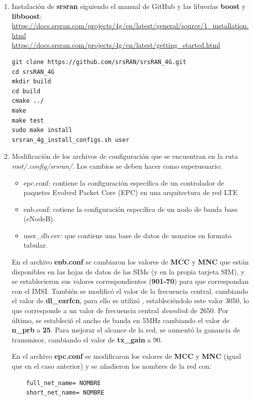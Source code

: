 \begin{enumerate}
\item Instalación de \textbf{srsran} siguiendo el manual de GitHub y las librerías \textbf{boost} y \textbf{libboost}:\\
\url{https://docs.srsran.com/projects/4g/en/latest/general/source/1_installation.html}\\
\url{https://docs.srsran.com/projects/4g/en/latest/getting_started.html}

\begin{lstlisting}
git clone https://github.com/srsRAN/srsRAN_4G.git
cd srsRAN_4G
mkdir build
cd build
cmake ../
make
make test
sudo make install
srsran_4g_install_configs.sh user
\end{lstlisting}

\item Modificación de los archivos de configuración que se encuentran en la ruta \textit{root/.config/srsran/}. Los cambios se deben hacer como superusuario:
\begin{itemize}
	\item epc.conf: contiene la configuración específica de un controlador de paquetes Evolved Packet Core (EPC) en una arquitectura de red LTE 
	\item enb.conf: cotiene la configuración específica de un nodo de banda base (eNodeB).
	\item user_db.csv: que contiene una base de datos de usuarios en formato tabular.
\end{itemize}

En el archivo \textbf{enb.conf} se cambiaron los valores de \textbf{MCC} y \textbf{MNC} que están disponibles en las hojas de datos de las SIMs (y en la propia tarjeta SIM), y se establecieron sus valores correspondientes (\textbf{901-70}) para que correspondan con el IMSI. También se modificó el valor de la frecuencia central. cambiando el valor de \textbf{dl_earfcn}, para ello se utilizó \cite{earn}, estableciéndolo este valor 3050, lo que corresponde a un valor de frecuencia central \textit{downlink} de 2650.  Por último, se estableció el ancho de banda en 5MHz cambiando el valor de \textbf{n_prb} a \textbf{25}. Para mejorar el alcance de la red, se aumentó la ganancia de transmisor, cambiando el valor de \textbf{tx_gain} a 90.

En el archivo \textbf{epc.conf} se modificaron los valores de \textbf{MCC} y \textbf{MNC} (igual que en el caso anterior) y se añadieron los nombres de la red con:
\begin{lstlisting}
    full_net_name= NOMBRE
    short_net_name= NOMBRE
\end{lstlisting}


\end{enumerate}
